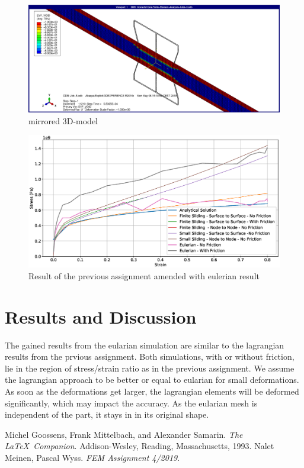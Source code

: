 \documentclass[12pt]{article}
\begin{document}
\begin{figure}[!htb]
  \centering
  \includegraphics[width=0.9\linewidth]{pics/sexy3Dbild}
  \caption{mirrored 3D-model}
  \label{fig:2}
\end{figure}

\begin{figure}[!htb]
  \centering
  \includegraphics[width=0.9\linewidth]{pics/analytical_compared_euler}
  \caption{Result of the previous assignment amended with eulerian result}
  \label{fig:3}
\end{figure}


\pagebreak
\section{Results and Discussion}

The gained results from the eularian simulation are similar to the lagrangian results from the 
prvious assignment. Both simulations, with or without friction, lie in the region
of stress/strain ratio as in the previous assignment. We assume the lagrangian approach to be better or 
equal to eularian for small deformations. As soon as the deformations get larger, the lagrangian elements
will be deformed significantly, which may impact the accuracy. As the eularian mesh is independent
of the part, it stays in in its original shape.


\pagebreak
\begin{thebibliography}{9}
  Michel Goossens, Frank Mittelbach, and Alexander Samarin. 
  \textit{The \LaTeX\ Companion}. 
  Addison-Wesley, Reading, Massachusetts, 1993.
  Nalet Meinen, Pascal Wyss.
  \textit{FEM Assignment 4/2019}. 
\end{thebibliography}
\end{document}

